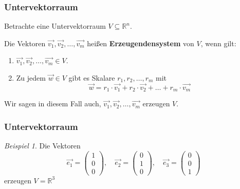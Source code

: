\documentclass[hyperref={pdfpagelabels=false}]{beamer}
\theoremstyle{plain}%
\theoremstyle{definition}
\theoremstyle{remark}
\newtheorem*{beispiel}{Beispiel}
\def \R{\mathbb R}
\newcommand{\vektor}[1]{\overrightarrow{#1}}
\begin{document}
\begin{frame}
\frametitle{Untervektorraum}
Betrachte eine Untervektorraum $V \subseteq \R^n$. 

\begin{definition} Die Vektoren $\vektor{v_1}, \vektor{v_2}, \ldots, 
\vektor{v_m}$ heißen \textbf{Erzeugendensystem} von $V$, wenn gilt:

\begin{enumerate}
\item<3-> $\vektor{v_1}, \vektor{v_2}, \ldots, \vektor{v_m} \in V$.
\item<4-> Zu jedem $\vektor{w} \in V$ gibt es Skalare $r_1, r_2, \ldots,  r_m$ mit
  	$$  \vektor{w} = r_1 \cdot \vektor{v_1} + r_2 \cdot \vektor{v_2} + \ldots + 
      r_m \cdot \vektor{v_m} $$
\end{enumerate}
\pause \pause \pause 
Wir sagen in diesem Fall auch,  $\vektor{v_1}, \vektor{v_2}, \ldots, 
\vektor{v_m}$ erzeugen $V$.
\end{definition}

\end{frame}

\begin{frame}
\frametitle{Untervektorraum}

\begin{beispiel} Die Vektoren  
	$$\vektor{e_1} = \left( \begin{matrix} 1 \\ 0 \\ 0 \end{matrix} \right), \quad 
	\vektor{e_2} = \left( \begin{matrix} 0 \\ 1 \\  0 \end{matrix} \right), \quad  
	\vektor{e_3} = \left( \begin{matrix} 0 \\ 0 \\ 1 \end{matrix} \right) $$ 
erzeugen $V = \mathbb R^3$
\end{beispiel}

\end{frame}
\end{document}
